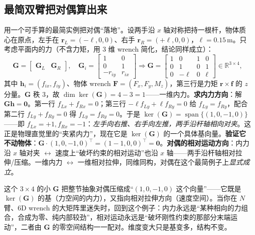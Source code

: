 \subsection{最简双臂把对偶算出来}
\label{sec:ma-worked-duality}

用一个可手算的最简实例把对偶“落地”。设两手沿 $x$ 轴对称把持一根杆，物体质心在原点，左手在 $\mathbf{r}_L=(-\ell,0,0)$、右手 $\mathbf{r}_R=(+\ell,0,0)$，$\ell=0.15$\,m。只考虑平面内的力（不含力矩，用 $3$ 维 wrench 简化，结论同样成立）：
\begin{equation}
  \mathbf{G}=\begin{bmatrix}\mathbf{G}_L & \mathbf{G}_R\end{bmatrix},\quad
  \mathbf{G}_i=\begin{bmatrix}1&0\\0&1\\-r_{iy}&r_{ix}\end{bmatrix}
  \Rightarrow
  \mathbf{G}=\begin{bmatrix}1&0&1&0\\0&1&0&1\\0&-\ell&0&\ell\end{bmatrix}\in\mathbb{R}^{3\times4},
  \label{eq:ma-worked-G}
\end{equation}
其中 $\mathbf{h}_i=(f_{ix},f_{iy})$、物体 wrench $\mathbf{F}=(F_x,F_y,M_z)$，第三行是力矩 $\mathbf{r}\times\mathbf{f}$ 的 $z$ 分量。$\mathbf{G}$ 秩 $3$，故 $\dim\ker(\mathbf{G})=4-3=1$——一维内力。\textbf{求内力方向}：解 $\mathbf{G}\mathbf{h}=\mathbf{0}$。第一行 $f_{Lx}+f_{Rx}=0$；第三行 $-\ell f_{Ly}+\ell f_{Ry}=0$ 给 $f_{Ly}=f_{Ry}$，配合第二行 $f_{Ly}+f_{Ry}=0$ 得 $f_{Ly}=f_{Ry}=0$。于是 $\ker(\mathbf{G})=\operatorname{span}\{(1,0,-1,0)\}$——即 $f_{Lx}=+1,f_{Rx}=-1$：\emph{左手向右推、右手向左推，两手沿杆轴相向对夹}。这正是物理直觉里的“夹紧内力”，现在它是 $\ker(\mathbf{G})$ 的一个具体基向量。\textbf{验证它不动物体}：$\mathbf{G}\cdot(1,0,-1,0)^\top=(1-1,0,0)^\top=\mathbf{0}$。\textbf{对偶的相对运动方向}：内力沿 $x$ 轴对夹 $\leftrightarrow$ 速度上“破坏约束的相对运动”也沿 $x$ 轴——两手沿杆轴相对拉伸/压缩。一维内力 $\leftrightarrow$ 一维相对拉伸，同维同构，对偶在这个最简例子上\emph{显式成立}。

\begin{insight}[从实例回看抽象]
这个 $3\times4$ 的小 $\mathbf{G}$ 把整节抽象对偶压缩成“$(1,0,-1,0)$ 这个向量”——它既是 $\ker(\mathbf{G})$ 的基（力空间的内力），又指向相对拉伸方向（速度空间）。当你在 $N$ 臂、$6$D wrench 的大矩阵里迷失时，回到这个例子：内力永远是“某种相向的力组合，合成为零、纯内部较劲”，相对运动永远是“破坏刚性约束的那部分末端运动”，二者由 $\mathbf{G}$ 的零空间结构一一配对。维度变大只是基变多，结构不变。
\end{insight}

